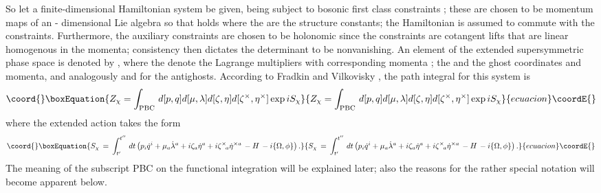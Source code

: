 \documentclass[a4paper,10pt]{article}
\begin{document}
So let a finite-dimensional Hamiltonian system be given, being subject to \coordHE{} bosonic 
first class constraints \coordHE{}; these are chosen to be momentum maps of an \coordHE{}-
dimensional Lie algebra \cite{Wood 92} so that 
\coordHE{} holds where the \coordHE{} are the 
structure constants; the Hamiltonian \coordHE{} is assumed to commute with the constraints. 
Furthermore, the auxiliary constraints \coordHE{} are chosen to be holonomic since the 
constraints are cotangent lifts that are linear homogenous in the momenta; consistency 
then dictates the determinant \myHighlight{$|\{\chi,\varphi\}|$}\coordHE{} to be nonvanishing. An element of the 
extended supersymmetric phase space is denoted by 
\coordHE{}, where the \coordHE{} 
denote the Lagrange multipliers with corresponding momenta \coordHE{}; the \coordHE{} and 
\coordHE{} the ghost coordinates and momenta, and analogously \coordHE{} and 
\coordHE{} for the antighosts. According to Fradkin and Vilkovisky \cite{Frad 
75}, the path integral for this system is
\begin{equation}\coord{}\boxEquation{\label{functionalintegralfv}
Z_{\chi}=\int_{\mathrm{PBC}}\,d[p,q]d[\mu,\lambda]d[\zeta,\eta]
d[\zeta^{\times},\eta^{\times}]
\exp iS_{\chi}
}{Z_{\chi}=\int_{\mathrm{PBC}}\,d[p,q]d[\mu,\lambda]d[\zeta,\eta]
d[\zeta^{\times},\eta^{\times}]
\exp iS_{\chi}
}{ecuacion}\coordE{}\end{equation}
where the extended action takes the form
\begin{equation}\coord{}\boxEquation{\label{actionfv}
S_{\chi}\,=\,\int_{t^{\prime}}^{t^{\prime\prime}}\,dt\left(p_i\dot{q}^i+\mu_a
\dot{\lambda}^a+i\zeta_a\dot{\eta}^a+i\zeta^
{\times}{\!}_a\dot{\eta}^{\times a}\,-H\,-i\{\Omega,\phi\}\right).
}{S_{\chi}\,=\,\int_{t^{\prime}}^{t^{\prime\prime}}\,dt\left(p_i\dot{q}^i+\mu_a
\dot{\lambda}^a+i\zeta_a\dot{\eta}^a+i\zeta^
{\times}{\!}_a\dot{\eta}^{\times a}\,-H\,-i\{\Omega,\phi\}\right).
}{ecuacion}\coordE{}\end{equation}
The meaning of the subscript PBC on the functional integration will be explained later; 
also the reasons for the rather special notation will become apparent below. 
\end{document}
